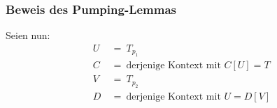    \begin{frame}
      \frametitle{Beweis des Pumping-Lemmas}
      
      Seien nun:
      \begin{align*}
        U & ~=~ T_{p_1} \\[4pt]
        C & ~=~ \text{derjenige Kontext mit~} C[U] = T \\[4pt]
        V & ~=~ T_{p_2} \\[4pt]
        D & ~=~ \text{derjenige Kontext mit~} U = D[V]
      \end{align*}

      \par\smallskip
    
      \par\bigskip
      
      \par\bigskip
      
    \end{frame}
      
